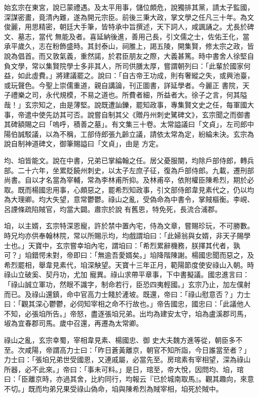 \begin{pinyinscope}
 始玄宗在東宮，說已蒙禮遇。及太平用事，儲位頗危，說獨排其黨，請太子監國，深謀密畫，竟清內難，遂為開元宗臣。前後三秉大政，掌文學之任凡三十年。為文俊麗，用思精密，朝廷大手筆，皆特承中旨撰述，天下詞人，咸諷誦之。尤長於碑文、墓志，當代
 無能及者。喜延納後進，善用己長，引文儒之士，佐佑王化，當承平歲久，志在粉飾盛時。其封泰山，祠脽上，謁五陵，開集賢，修太宗之政，皆說為倡首。而又敦氣義，重然諾，於君臣朋友之際，大義甚篤。時中書舍人徐堅自負文學，常以集賢院學士多非其人，所司供膳太厚，嘗謂朝列曰：「此輩於國家何益，如此虛費。」將建議罷之。說曰：「自古帝王功成，則有奢縱之失，或興池臺，或玩聲色。今聖上崇儒重道，親自講論，刊正圖書，詳延學者。今麗正
 書院，天子禮樂之司，永代規模，不易之道也。所費者細，所益者大。徐子之言，何其隘哉！」玄宗知之，由是薄堅。說既遭訕鑠，罷知政事，專集賢文史之任，每軍國大事，帝遣中使先訪其可否。說嘗自制其父《贈丹州刺史騭碑文》，玄宗聞之而御書其碑額賜之曰「嗚呼，積善之墓」。有文集三十卷。太常謚議曰「文貞」，左司郎中陽伯誠駁議，以為不稱，工部侍郎張九齡立議，請依太常為定，紛綸未決。玄宗為說自制神道碑文，御筆賜謚曰「文貞」，由是
 方定。



 均、垍皆能文。說在中書，兄弟已掌綸翰之任。居父憂服闋，均除戶部侍郎，轉兵部。二十六年，坐累貶饒州刺史，以太子左庶子征，復為戶部侍郎。九載，遷刑部尚書。自以才名當為宰輔，常為李林甫所抑。及林甫卒，依附權臣陳希烈，期於必取。既而楊國忠用事，心頗惡之，罷希烈知政事，引文部侍郎韋見素代之，仍以均為大理卿。均大失望，意常鬱鬱。祿山之亂，受偽命為中書令，掌賊樞衡。李峴、呂諲條疏陷賊官，均當大闢。肅宗於說
 有舊恩，特免死，長流合浦郡。



 垍，以主婿，玄宗特深恩寵，許於禁中置內宅，侍為文章，嘗賜珍玩，不可勝數。時兄均亦供奉翰林院，常以所賜示均，均戲謂垍曰：「此婦翁與女婿，非天子賜學士也。」天寶中，玄宗嘗幸垍內宅，謂垍曰：「希烈累辭機務，朕擇其代者，孰可？」垍錯愕未對，帝即曰：「無逾吾愛婿矣。」垍降階陳謝。楊國忠聞而惡之，及希烈罷相，舉韋見素代，垍深觖望。天寶十三年正月，範陽節度使安祿山入朝。時祿山立破奚、契丹功，尤加
 寵異。祿山求帶平章事，下中書擬議。國忠進言曰：「祿山誠立軍功，然眼不識字，制命若行，臣恐四夷輕國。」玄宗乃止，加左僕射而已。及祿山還鎮，命中官高力士餞於滻坡。既還，帝曰：「祿山慰意否？」力士曰：「觀其深心鬱鬱，必伺知宰相之命不行故也。」帝告國忠，國忠曰：「此議他人不知，必張垍所告。」帝怒，盡逐張垍兄弟。出均為建安太守，垍為盧溪郡司馬，埱為宜春郡司馬。歲中召還，再遷為太常卿。



 祿山之亂，玄宗幸蜀，宰相韋見素、楊國忠、御
 史大夫魏方進等從，朝臣多不至。次咸陽，帝謂高力士曰：「昨日蒼黃離京，朝官不知所詣，今日誰當至者？」力士曰：「張垍兄弟世受國恩，又連戚屬，必當先至。房琯素有宰相望，深為祿山所器，必不此來。」帝曰：「事未可料。」是日，琯至，帝大悅，因問均、垍，琯曰：「臣離京時，亦過其舍，比約同行，均報云『已於城南取馬』。觀其趣向，來意不切。」既而均弟兄果受祿山偽命，垍與陳希烈為賊宰相，垍死於賊中。




\end{pinyinscope}
